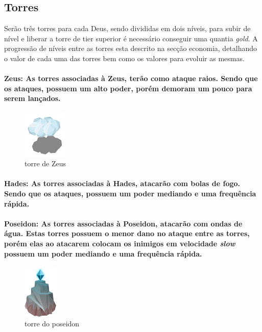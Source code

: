 \documentclass[11pt]{article} %
\begin{document}
\newpage


\subsection{Torres}
Serão três torres para cada Deus, sendo divididas em dois níveis, para subir de nível e liberar a torre de tier superior é necessário conseguir uma quantia \textit{gold}. A progressão de níveis entre as torres esta descrito na secção economia, detalhando o valor de cada uma das torres bem como os valores para evoluir as mesmas.

\paragraph{{\Large Zeus}: As torres associadas à Zeus, terão como ataque raios. Sendo que os ataques, possuem um alto poder, porém demoram um pouco para serem lançados.}

\begin{figure}[!htp]
\centering
\includegraphics[scale=1.3]{res/characters/zeus_tower.png}
\caption{torre de Zeus}
\label{satiro}
\end{figure}

\paragraph{{\Large Hades}: As torres associadas à Hades, atacarão com bolas de fogo. Sendo que os ataques, possuem um poder mediando e uma frequência rápida.}

\paragraph{{\Large Poseidon}: As torres associadas à Poseidon, atacarão com ondas de água. Estas torres possuem o menor dano no ataque entre as torres, porém elas ao atacarem colocam os inimigos em velocidade \textit{slow} possuem um poder mediando e uma frequência rápida.}

\begin{figure}[!htp]
\centering
\includegraphics[scale=1.3]{res/characters/poseidon_tower.png}
\caption{torre do poseidon}
\label{satiro}
\end{figure}
\end{document}
